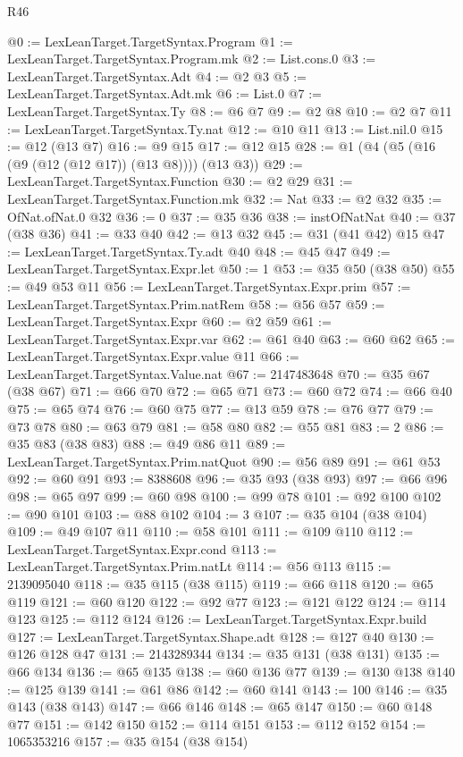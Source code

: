 \begin{lexlean}{R46}
\begin{coremodule}
@0 := LexLeanTarget.TargetSyntax.Program
@1 := LexLeanTarget.TargetSyntax.Program.mk
@2 := List.cons.{0}
@3 := LexLeanTarget.TargetSyntax.Adt
@4 := @2 @3
@5 := LexLeanTarget.TargetSyntax.Adt.mk
@6 := List.{0}
@7 := LexLeanTarget.TargetSyntax.Ty
@8 := @6 @7
@9 := @2 @8
@10 := @2 @7
@11 := LexLeanTarget.TargetSyntax.Ty.nat
@12 := @10 @11
@13 := List.nil.{0}
@15 := @12 (@13 @7)
@16 := @9 @15
@17 := @12 @15
@28 := @1 (@4 (@5 (@16 (@9 (@12 (@12 @17)) (@13 @8)))) (@13 @3))
@29 := LexLeanTarget.TargetSyntax.Function
@30 := @2 @29
@31 := LexLeanTarget.TargetSyntax.Function.mk
@32 := Nat
@33 := @2 @32
@35 := OfNat.ofNat.{0} @32
@36 := 0
@37 := @35 @36
@38 := instOfNatNat
@40 := @37 (@38 @36)
@41 := @33 @40
@42 := @13 @32
@45 := @31 (@41 @42) @15
@47 := LexLeanTarget.TargetSyntax.Ty.adt @40
@48 := @45 @47
@49 := LexLeanTarget.TargetSyntax.Expr.let
@50 := 1
@53 := @35 @50 (@38 @50)
@55 := @49 @53 @11
@56 := LexLeanTarget.TargetSyntax.Expr.prim
@57 := LexLeanTarget.TargetSyntax.Prim.natRem
@58 := @56 @57
@59 := LexLeanTarget.TargetSyntax.Expr
@60 := @2 @59
@61 := LexLeanTarget.TargetSyntax.Expr.var
@62 := @61 @40
@63 := @60 @62
@65 := LexLeanTarget.TargetSyntax.Expr.value @11
@66 := LexLeanTarget.TargetSyntax.Value.nat
@67 := 2147483648
@70 := @35 @67 (@38 @67)
@71 := @66 @70
@72 := @65 @71
@73 := @60 @72
@74 := @66 @40
@75 := @65 @74
@76 := @60 @75
@77 := @13 @59
@78 := @76 @77
@79 := @73 @78
@80 := @63 @79
@81 := @58 @80
@82 := @55 @81
@83 := 2
@86 := @35 @83 (@38 @83)
@88 := @49 @86 @11
@89 := LexLeanTarget.TargetSyntax.Prim.natQuot
@90 := @56 @89
@91 := @61 @53
@92 := @60 @91
@93 := 8388608
@96 := @35 @93 (@38 @93)
@97 := @66 @96
@98 := @65 @97
@99 := @60 @98
@100 := @99 @78
@101 := @92 @100
@102 := @90 @101
@103 := @88 @102
@104 := 3
@107 := @35 @104 (@38 @104)
@109 := @49 @107 @11
@110 := @58 @101
@111 := @109 @110
@112 := LexLeanTarget.TargetSyntax.Expr.cond
@113 := LexLeanTarget.TargetSyntax.Prim.natLt
@114 := @56 @113
@115 := 2139095040
@118 := @35 @115 (@38 @115)
@119 := @66 @118
@120 := @65 @119
@121 := @60 @120
@122 := @92 @77
@123 := @121 @122
@124 := @114 @123
@125 := @112 @124
@126 := LexLeanTarget.TargetSyntax.Expr.build
@127 := LexLeanTarget.TargetSyntax.Shape.adt
@128 := @127 @40
@130 := @126 @128 @47
@131 := 2143289344
@134 := @35 @131 (@38 @131)
@135 := @66 @134
@136 := @65 @135
@138 := @60 @136 @77
@139 := @130 @138
@140 := @125 @139
@141 := @61 @86
@142 := @60 @141
@143 := 100
@146 := @35 @143 (@38 @143)
@147 := @66 @146
@148 := @65 @147
@150 := @60 @148 @77
@151 := @142 @150
@152 := @114 @151
@153 := @112 @152
@154 := 1065353216
@157 := @35 @154 (@38 @154)

\end{coremodule}
\end{lexlean}
